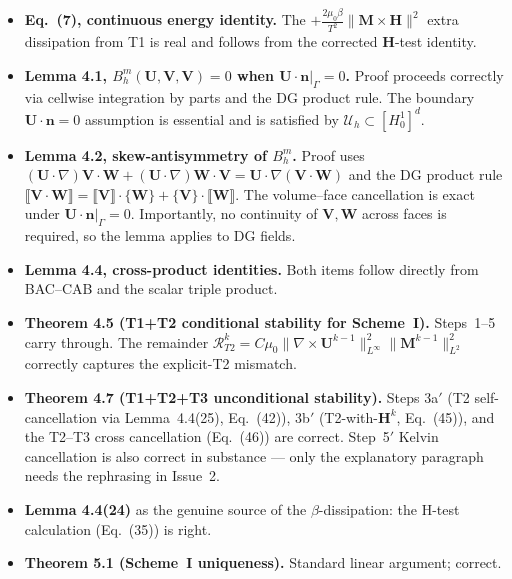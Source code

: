 \documentclass[11pt]{article}
\newcommand{\bM}{\mathbf{M}}
\newcommand{\bH}{\mathbf{H}}
\newcommand{\bU}{\mathbf{U}}
\newcommand{\bV}{\mathbf{V}}
\newcommand{\bW}{\mathbf{W}}
\newcommand{\bn}{\mathbf{n}}
\newcommand{\Bhm}{B_h^{m}}
\begin{document}
\begin{itemize}[leftmargin=*,itemsep=2pt]
\item \textbf{Eq.~(7), continuous energy identity.}  The
$+\frac{2\mu_{0}\beta}{T^{2}}\|\bM\times\bH\|^{2}$ extra dissipation
from T1 is real and follows from the corrected $\bH$-test identity.

\item \textbf{Lemma 4.1, $\Bhm(\bU,\bV,\bV)=0$ when
$\bU\!\cdot\!\bn|_{\Gamma}=0$.}  Proof proceeds correctly via cellwise
integration by parts and the DG product rule.  The boundary
$\bU\!\cdot\!\bn=0$ assumption is essential and is satisfied by
$\mathcal{U}_{h}\subset[H^{1}_{0}]^{d}$.

\item \textbf{Lemma 4.2, skew-antisymmetry of $\Bhm$.}  Proof uses
$(\bU\!\cdot\!\nabla)\bV\!\cdot\!\bW + (\bU\!\cdot\!\nabla)\bW\!\cdot\!\bV
= \bU\!\cdot\!\nabla(\bV\!\cdot\!\bW)$ and the DG product rule
$\llbracket\bV\!\cdot\!\bW\rrbracket
= \llbracket\bV\rrbracket\!\cdot\!\{\bW\}+\{\bV\}\!\cdot\!\llbracket\bW\rrbracket$.
The volume--face cancellation is exact under
$\bU\!\cdot\!\bn|_{\Gamma}=0$.  Importantly, no continuity of $\bV,\bW$
across faces is required, so the lemma applies to DG fields.

\item \textbf{Lemma 4.4, cross-product identities.}  Both items
follow directly from BAC--CAB and the scalar triple product.

\item \textbf{Theorem 4.5 (T1+T2 conditional stability for
Scheme~I).}  Steps~1--5 carry through.  The remainder
$\mathcal{R}_{T2}^{k}=C\mu_{0}\|\nabla\!\times\!\bU^{k-1}\|_{L^{\infty}}^{2}
\|\bM^{k-1}\|_{L^{2}}^{2}$ correctly captures the explicit-T2
mismatch.

\item \textbf{Theorem 4.7 (T1+T2+T3 unconditional stability).}
Steps 3a$'$ (T2 self-cancellation via Lemma~4.4(25), Eq.~(42)),
3b$'$ (T2-with-$\bH^{k}$, Eq.~(45)), and the T2--T3 cross
cancellation (Eq.~(46)) are correct.  Step~5$'$ Kelvin cancellation
is also correct in substance --- only the explanatory paragraph
needs the rephrasing in Issue~2.

\item \textbf{Lemma 4.4(24)} as the genuine source of the
$\beta$-dissipation: the H-test calculation (Eq.~(35)) is right.

\item \textbf{Theorem 5.1 (Scheme~I uniqueness).}  Standard linear
argument; correct.


\end{itemize}
\end{document}
